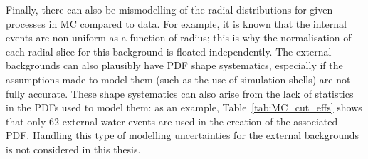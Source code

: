 Finally, there can also be mismodelling of the radial distributions for given processes in MC compared to data. For example, it is known that the internal  events are non-uniform as a function of radius; this is why the normalisation of each radial slice for this background is floated independently. The external backgrounds can also plausibly have PDF shape systematics, especially if the assumptions made to model them (such as the use of simulation shells) are not fully accurate. These shape systematics can also arise from the lack of statistics in the PDFs used to model them: as an example, Table~\ref{tab:MC_cut_effs} shows that only 62 external water  events are used in the creation of the associated PDF. Handling this type of modelling uncertainties for the external backgrounds is not considered in this thesis.




